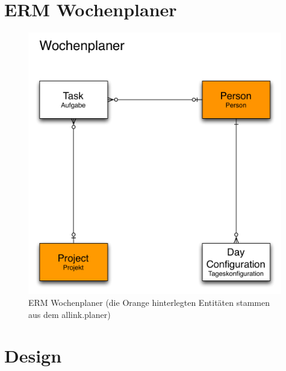 \section{ERM Wochenplaner}
\begin{figure}[!ht]
\begin{center}
\includegraphics[width=0.99\textwidth,angle=0]{./bilder/erm.pdf}
\caption{ERM Wochenplaner (die Orange hinterlegten Entitäten stammen aus dem allink.planer)}
\end{center}
\end{figure}

\section{Design}

